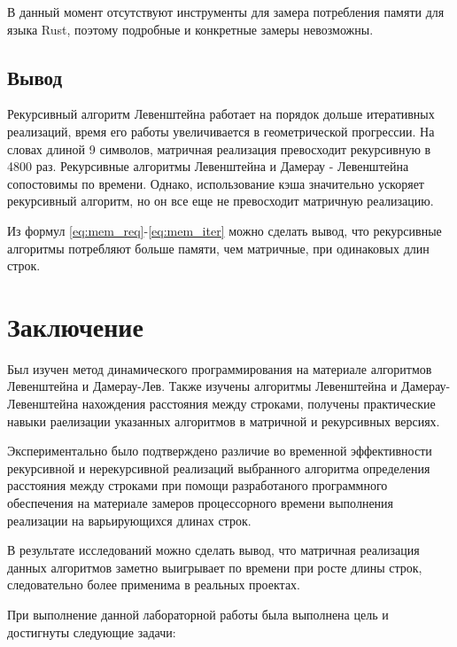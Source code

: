 \documentclass[14pt,russian]{scrartcl}
\newcommand{\anonsection}[1]{\cleardoublepage
\phantomsection
\addcontentsline{toc}{section}{\protect\numberline{}#1}
\section*{#1}\vspace*{2.5ex} %
}
\begin{document}
	\par
	В данный момент отсутствуют инструменты для замера потребления памяти для языка Rust, поэтому подробные и конкретные замеры невозможны.

	\subsection{Вывод}

	\par
	Рекурсивный алгоритм Левенштейна работает на порядок дольше итеративных реализаций, время его работы увеличивается в геометрической прогрессии. На словах длиной 9 символов, матричная реализация превосходит рекурсивную в 4800 раз. Рекурсивные алгоритмы Левенштейна и Дамерау - Левенштейна сопостовимы по времени. Однако, использование кэша значительно ускоряет рекурсивный алгоритм, но он все еще не превосходит матричную реализацию.

	Из формул \ref{eq:mem_req}-\ref{eq:mem_iter} можно сделать вывод, что рекурсивные алгоритмы потребляют больше памяти, чем матричные, при одинаковых длин строк.

	\anonsection{Заключение}

	Был изучен метод динамического программирования на материале алгоритмов Левенштейна и Дамерау-Лев.
	Также изучены алгоритмы Левенштейна и Дамерау-Левенштейна нахождения расстояния между строками, получены практические навыки раелизации указанных алгоритмов
	в матричной  и рекурсивных версиях. 
	\newline

	Экспериментально было подтверждено различие во временной эффективности рекурсивной и нерекурсивной реализаций выбранного алгоритма определения расстояния между строками при помощи разработаного программного обеспечения на материале замеров процессорного времени выполнения реализации на варьирующихся длинах строк. 
	\newline

	В результате исследований можно сделать вывод, что матричная реализация данных алгоритмов заметно выигрывает по времени при росте длины строк, следовательно более применима в реальных проектах.
	\newline
	
	При выполнение данной лабораторной работы была выполнена цель и достигнуты следующие задачи:
\end{document}
